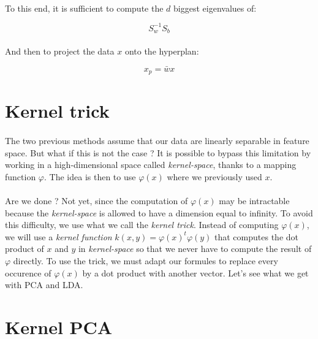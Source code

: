 \documentclass[a4paper]{article}
\begin{document}
\paragraph{}
To this end, it is sufficient to compute the $d$ biggest eigenvalues of:

\begin{equation*}
S_w^{-1}S_b
\end{equation*}

\paragraph{}
And then to project the data $x$ onto the hyperplan:

\begin{equation*}
x_p = \bar{w}x
\end{equation*}


\section*{Kernel trick}

\paragraph{}
The two previous methods assume that our data are linearly separable in feature space. But what if this is not the case ? It is possible to bypass this limitation by working in a high-dimensional space called \emph{kernel-space}, thanks to a mapping function $\varphi$. The idea is then to use $\varphi(x)$ where we previously used $x$.

\paragraph{}
Are we done ? Not yet, since the computation of $\varphi(x)$ may be intractable because the \emph{kernel-space} is allowed to have a dimension equal to infinity. To avoid this difficulty, we use what we call the \emph{kernel trick}. Instead of computing $\varphi(x)$, we will use a \emph{kernel function} $k(x, y) = \varphi(x)^t\varphi(y)$ that computes the dot product of $x$ and $y$ in \emph{kernel-space} so that we never have to compute the result of $\varphi$ directly. To use the trick, we must adapt our formules to replace every occurence of $\varphi(x)$ by a dot product with another vector. Let's see what we get with PCA and LDA.


\section*{Kernel PCA}
\end{document}
